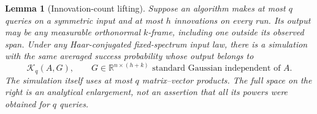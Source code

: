 \documentclass[11pt]{article}
\newtheorem{lemma}[theorem]{Lemma}
\theoremstyle{definition}
\newcommand{\R}{\mathbb R}
\newcommand{\K}{\mathcal K}
\begin{document}
\begin{lemma}[Innovation-count lifting]\label{lem:lifting}
Suppose an algorithm makes at most $q$ queries on a symmetric input and at most $h$ innovations on every run. Its output may be any measurable orthonormal $k$-frame, including one outside its observed span. Under any Haar-conjugated fixed-spectrum input law, there is a simulation with the same averaged success probability whose output belongs to
\begin{equation}\label{eq:lifting}
 \K_q(A,G),\qquad G\in\R^{n\times(h+k)}\text{ standard Gaussian independent of }A.
\end{equation}
The simulation itself uses at most $q$ matrix--vector products. The full space on the right is an analytical enlargement, not an assertion that all its powers were obtained for $q$ queries.
\end{lemma}
\end{document}
